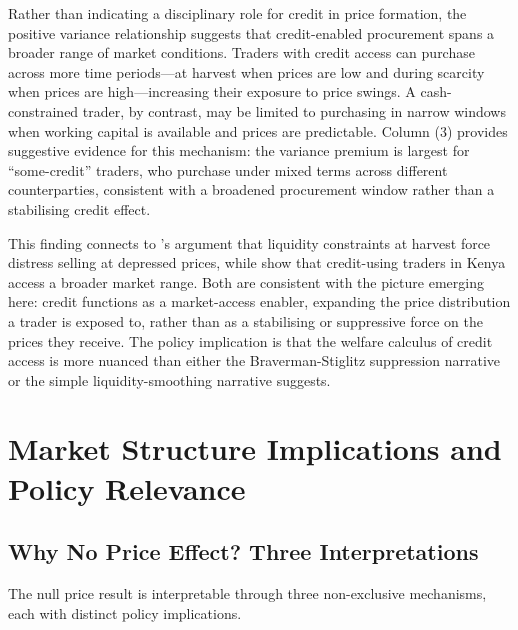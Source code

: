 \documentclass[authoryear,preprint,review,12pt]{elsarticle}
\begin{document}
Rather than indicating a disciplinary role for credit in price formation,
the positive variance relationship suggests that credit-enabled procurement
spans a broader range of market conditions. Traders with credit access
can purchase across more time periods---at harvest when prices are low
and during scarcity when prices are high---increasing their exposure to
price swings. A cash-constrained trader, by contrast, may be limited to
purchasing in narrow windows when working capital is available and prices
are predictable. Column (3) provides suggestive evidence for this
mechanism: the variance premium is largest for ``some-credit'' traders,
who purchase under mixed terms across different counterparties, consistent
with a broadened procurement window rather than a stabilising credit effect.

This finding connects to \citet{barrett2008}'s argument that liquidity
constraints at harvest force distress selling at depressed prices, while
\citet{stephens_barrett2011} show that credit-using traders in Kenya access
a broader market range. Both are consistent with the picture emerging
here: credit functions as a market-access enabler, expanding the price
distribution a trader is exposed to, rather than as a stabilising or
suppressive force on the prices they receive. The policy implication is
that the welfare calculus of credit access is more nuanced than either the
Braverman-Stiglitz suppression narrative or the simple liquidity-smoothing
narrative suggests.

\section{Market Structure Implications and Policy Relevance}
\label{sec:implications}

\subsection{Why No Price Effect? Three Interpretations}

The null price result is interpretable through three non-exclusive mechanisms,
each with distinct policy implications.
\end{document}
